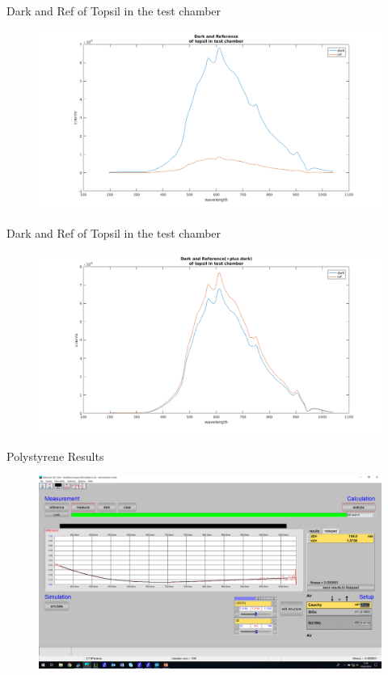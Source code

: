 \documentclass[10pt]{beamer}
\begin{document}
		\begin{frame}{Dark and Ref of Topsil in the test chamber}
		\begin{figure}
		\centering
		\includegraphics[scale=0.35]{darkref1.png}
		\end{figure}
		\end{frame}
		\begin{frame}{Dark and Ref of Topsil in the test chamber}
		\begin{figure}
		\centering
		\includegraphics[scale=0.35]{darkref2.png}
		\end{figure}
		\end{frame}
	
		\begin{frame}{Polystyrene Results}
			\begin{figure}
			\centering
			\includegraphics[width=\textwidth]{p1.png}
			\end{figure}
			\end{frame}
	
\end{document}
